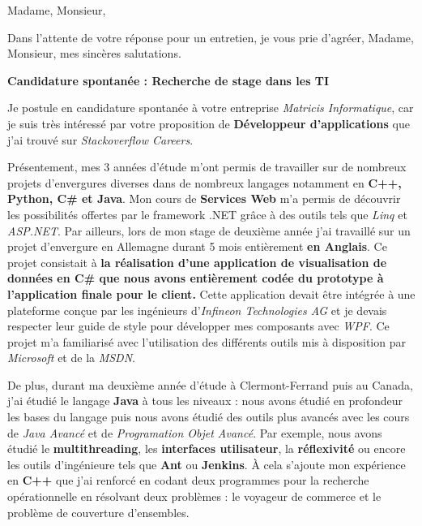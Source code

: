 \date{\today}
\opening{Madame, Monsieur,}
\closing{Dans l'attente de votre réponse pour un entretien, je vous prie d'agréer, Madame, Monsieur, mes sincères salutations.}

\makelettertitle

\textbf{Candidature spontanée : Recherche de stage dans les TI}

\introduction{}
Je postule en candidature spontanée à votre entreprise \textit{Matricis Informatique}, car je suis très intéressé par votre proposition de \textbf{Développeur d'applications} que j'ai trouvé sur \textit{Stackoverflow Careers}.

Présentement, mes 3 années d'étude m'ont permis de travailler sur de nombreux projets d'envergures diverses dans de nombreux langages notamment en \textbf{C++, Python, C\# et Java}. Mon cours de \textbf{Services Web} m'a permis de découvrir les possibilités offertes par le framework .NET grâce à des outils tels que \textit{Linq} et \textit{ASP.NET}. Par ailleurs, lors de mon stage de deuxième année j'ai travaillé sur un projet d'envergure en Allemagne durant 5 mois entièrement \textbf{en Anglais}. Ce projet consistait à \textbf{la réalisation d'une application de visualisation de données en C\# que nous avons entièrement codée du prototype à l'application finale pour le client.} Cette application devait être intégrée à une plateforme conçue par les ingénieurs d'\textit{Infineon Technologies AG} et je devais respecter leur guide de style pour développer mes composants avec \textit{WPF}. Ce projet m'a familiarisé avec l'utilisation des différents outils mis à disposition par \textit{Microsoft} et de la \textit{MSDN}.

De plus, durant ma deuxième année d'étude à Clermont-Ferrand puis au Canada, j'ai étudié le langage \textbf{Java} à tous les niveaux : nous avons étudié en profondeur les bases du langage puis nous avons étudié des outils plus avancés avec les cours de \textit{Java Avancé} et de \textit{Programation Objet Avancé}. Par exemple, nous avons étudié le \textbf{multithreading}, les \textbf{interfaces utilisateur}, la \textbf{réflexivité} ou encore les outils d'ingénieure tels que \textbf{Ant} ou \textbf{Jenkins}. À cela s'ajoute mon expérience en \textbf{C++} que j'ai renforcé en codant deux programmes pour la recherche opérationnelle en résolvant deux problèmes : le voyageur de commerce et le problème de couverture d'ensembles.

